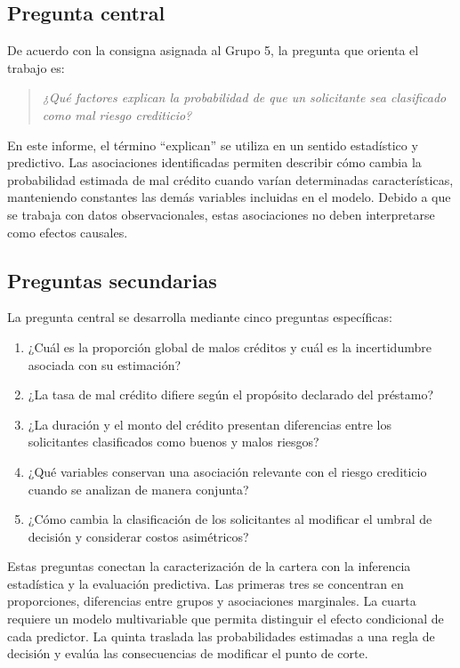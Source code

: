 \subsection{Pregunta central}

De acuerdo con la consigna asignada al Grupo 5, la pregunta que orienta
el trabajo es:

\begin{quote}
    \itshape
    ¿Qué factores explican la probabilidad de que un solicitante sea
    clasificado como mal riesgo crediticio?
\end{quote}

En este informe, el término ``explican'' se utiliza en un sentido
estadístico y predictivo. Las asociaciones identificadas permiten
describir cómo cambia la probabilidad estimada de mal crédito cuando
varían determinadas características, manteniendo constantes las demás
variables incluidas en el modelo. Debido a que se trabaja con datos
observacionales, estas asociaciones no deben interpretarse como efectos
causales.

\subsection{Preguntas secundarias}

La pregunta central se desarrolla mediante cinco preguntas específicas:

\begin{enumerate}
    \item ¿Cuál es la proporción global de malos créditos y cuál es la
    incertidumbre asociada con su estimación?

    \item ¿La tasa de mal crédito difiere según el propósito declarado
    del préstamo?

    \item ¿La duración y el monto del crédito presentan diferencias
    entre los solicitantes clasificados como buenos y malos riesgos?

    \item ¿Qué variables conservan una asociación relevante con el
    riesgo crediticio cuando se analizan de manera conjunta?

    \item ¿Cómo cambia la clasificación de los solicitantes al modificar
    el umbral de decisión y considerar costos asimétricos?
\end{enumerate}

Estas preguntas conectan la caracterización de la cartera con la
inferencia estadística y la evaluación predictiva. Las primeras tres se
concentran en proporciones, diferencias entre grupos y asociaciones
marginales. La cuarta requiere un modelo multivariable que permita
distinguir el efecto condicional de cada predictor. La quinta traslada
las probabilidades estimadas a una regla de decisión y evalúa las
consecuencias de modificar el punto de corte.

